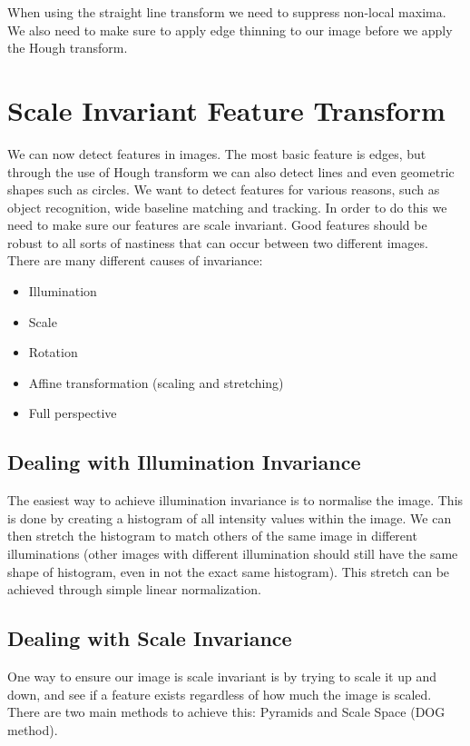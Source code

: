 \documentclass{article}
\begin{document}
	When using the straight line transform we need to suppress non-local maxima. We also need to make sure to apply edge thinning to our image before we apply the Hough transform.
	
	\section{Scale Invariant Feature Transform}
	We can now detect features in images. The most basic feature is edges, but through the use of Hough transform we can also detect lines and even geometric shapes such as circles. We want to detect features for various reasons, such as object recognition, wide baseline matching and tracking. In order to do this we need to make sure our features are scale invariant. Good features should be robust to all sorts of nastiness that can occur between two different images. There are many different causes of invariance:
	\begin{itemize}
		\item Illumination
		\item Scale
		\item Rotation
		\item Affine transformation (scaling and stretching)
		\item Full perspective
	\end{itemize}
	
	\subsection{Dealing with Illumination Invariance}
	The easiest way to achieve illumination invariance is to normalise the image. This is done by creating a histogram of all intensity values within the image. We can then stretch the histogram to match others of the same image in different illuminations (other images with different illumination should still have the same shape of histogram, even in not the exact same histogram). This stretch can be achieved through simple linear normalization.
	
	\subsection{Dealing with Scale Invariance}
	 One way to ensure our image is scale invariant is by trying to scale it up and down, and see if a feature exists regardless of how much the image is scaled. There are two main methods to achieve this: Pyramids and Scale Space (DOG method). 
	
\end{document}
